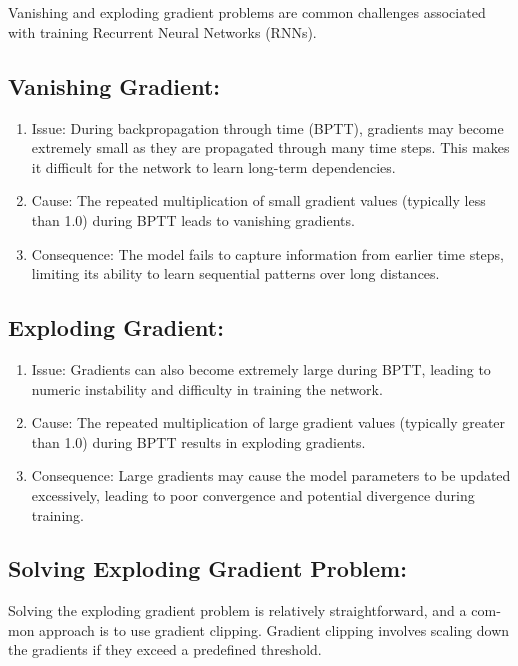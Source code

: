 \documentclass{article}
\begin{document}
\section{}
\begin{latin}
Vanishing and exploding gradient problems are common challenges associated with training Recurrent Neural Networks (RNNs).

    \subsection{Vanishing Gradient:}
\begin{enumerate}
        \item Issue: During backpropagation through time (BPTT), gradients may become extremely small as they are propagated through many time steps. This makes it difficult for the network to learn long-term dependencies.
        \item Cause: The repeated multiplication of small gradient values (typically less than 1.0) during BPTT leads to vanishing gradients.
        \item Consequence: The model fails to capture information from earlier time steps, limiting its ability to learn sequential patterns over long distances.
\end{enumerate}
    \subsection{Exploding Gradient:}
\begin{enumerate}
        \item Issue: Gradients can also become extremely large during BPTT, leading to numeric instability and difficulty in training the network.
        \item Cause: The repeated multiplication of large gradient values (typically greater than 1.0) during BPTT results in exploding gradients.
        \item Consequence: Large gradients may cause the model parameters to be updated excessively, leading to poor convergence and potential divergence during training.
\end{enumerate}
\subsection{Solving Exploding Gradient Problem:}
Solving the exploding gradient problem is relatively straightforward, and a common approach is to use gradient clipping. Gradient clipping involves scaling down the gradients if they exceed a predefined threshold.

\end{latin}
\end{document}
